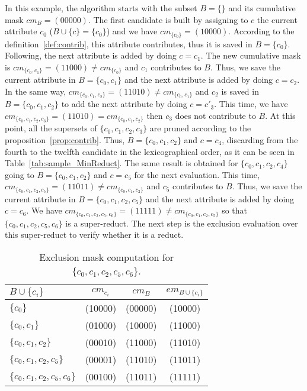 \documentclass[authoryear,preprint,review,12pt]{elsarticle}
\begin{document}
	\label{par:step}
	In this example, the algorithm starts with the subset $B=\lbrace \rbrace$ and its cumulative mask $cm_B=(00000)$. The first candidate is built by assigning to $c$ the current attribute  $c_0$ ($B\cup \lbrace c\rbrace = \lbrace c_0\rbrace$) and we have $cm_{\lbrace c_0\rbrace}=(10000)$. According to the definition~\ref{def:contrib}, this attribute contributes, thus it is saved in $B=\lbrace c_0\rbrace$. Following, the next attribute is added  by doing $c = c_1$. The new cumulative mask is $cm_{\lbrace c_0,c_1\rbrace}=(11000)\neq cm_{\lbrace c_0\rbrace}$ and $c_1$ contributes to $B$. Thus, we save the current attribute in $B = \lbrace c_0,c_1\rbrace$ and the next attribute is added by doing $c = c_2$. In the same way, $cm_{\lbrace c_0,c_1,c_2\rbrace}=(11010)\neq cm_{\lbrace c_0,c_1\rbrace}$ and $c_2$ is saved in $B = \lbrace c_0,c_1,c_2\rbrace$ to add the next attribute by doing $c = c'_3$. This time, we have $cm_{\lbrace c_0,c_1,c_2,c_3\rbrace}=(11010) = cm_{\lbrace c_0,c_1,c_2\rbrace}$ then $c_3$ does not contribute to $B$. At this point, all the supersets of $\lbrace c_0,c_1,c_2,c_3\rbrace$ are pruned according to the proposition~\ref{prop:contrib}. Thus, $B = \lbrace c_0,c_1,c_2\rbrace$ and $c = c_4$, discarding from the fourth to the twelfth candidate in the lexicographical order, as it can be seen in  Table~\ref{tab:sample_MinReduct}. The same result is obtained for $\lbrace c_0,c_1,c_2,c_4\rbrace$ going to $B = \lbrace c_0,c_1,c_2\rbrace$ and $c = c_5$ for the next evaluation. This time, $cm_{\lbrace c_0,c_1,c_2,c_5\rbrace}=(11011)\neq cm_{\lbrace c_0,c_1,c_2\rbrace}$ and $c_5$ contributes to $B$. Thus, we save the current attribute in $B = \lbrace c_0,c_1,c_2,c_5\rbrace$ and the next attribute is added by doing $c = c_6$. We have $cm_{\lbrace c_0,c_1,c_2,c_5,c_6\rbrace}=(11111)\neq cm_{\lbrace c_0,c_1,c_2,c_5\rbrace}$ so that $\lbrace c_0,c_1,c_2,c_5,c_6\rbrace$ is a super-reduct. The next step is the exclusion evaluation over this super-reduct to verify whether it is a reduct.
	  
  	\begin{table}[!htb]
  		\caption{Exclusion mask computation for $\lbrace c_0,c_1,c_2,c_5,c_6\rbrace$.}\label{tab:em}
  		\centering 
  		\begin{tabular}{|l|c|c|c|}
  			\hline
  			$B\cup \lbrace c_i\rbrace$                          & $cm_{c_i}$ & $cm_B$  & $em_{B\cup \lbrace c_i\rbrace}$ \\
  			\hline
  			$\lbrace c_0\rbrace$                 & (10000)    & (00000) & (10000)          \\
  			$\lbrace c_0,c_1\rbrace$             & (01000)    & (10000) & (11000)          \\
  			$\lbrace c_0,c_1,c_2\rbrace$         & (00010)    & (11000) & (11010)          \\
  			$\lbrace c_0,c_1,c_2,c_5\rbrace$     & (00001)    & (11010) & (11011)          \\
  			$\lbrace c_0,c_1,c_2,c_5,c_6\rbrace$ & (00100)    & (11011) & (11111)          \\
  			\hline
  		\end{tabular}
  	\end{table}
	  	
\end{document}
